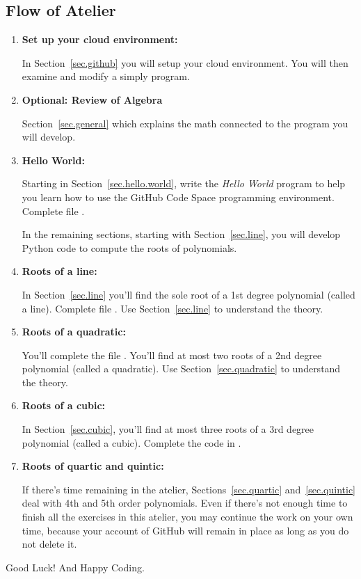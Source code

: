 \subsection{Flow of Atelier}
\begin{enumerate}
\item \textbf{ Set up your cloud environment:}

  In Section~\ref{sec.github} you will setup your cloud environment. You
  will then examine and modify a simply  program.

\item \textbf{Optional: Review of Algebra}

  Section~\ref{sec.general} which explains the math
  connected to the program you will develop.

\item \textbf{Hello World:}

  Starting in Section~\ref{sec.hello.world}, write the
  \emph{Hello World} program to help you learn how to use the GitHub
  Code Space programming environment.  Complete file .

In the remaining sections, starting with Section~\ref{sec.line}, you
will develop Python code to compute the roots of polynomials.  

\item \textbf{Roots of a line:}

  In Section~\ref{sec.line} you'll find the sole root of a 1st
  degree polynomial (called a line).  Complete file .
  Use Section~\ref{sec.line} to understand the theory.

\item \textbf{Roots of a quadratic:}

  You'll complete the file
  .  You'll find at most two roots of a 2nd degree
  polynomial (called a quadratic).  Use Section~\ref{sec.quadratic} to
  understand the theory.

\item \textbf{Roots of a cubic:}

  In Section~\ref{sec.cubic}, you'll find at most
  three roots of a 3rd degree polynomial (called a cubic).  Complete
  the code in .

\item \textbf{Roots of quartic and quintic:}

  If there's time remaining in the
  atelier, Sections~\ref{sec.quartic} and~\ref{sec.quintic} deal with
  4th and 5th order polynomials.  Even if there's not enough time to
  finish all the exercises in this atelier, you may continue the work
  on your own time, because your account of GitHub will remain in
  place as long as you do not delete it.
  
\end{enumerate}


Good Luck! And Happy Coding.


